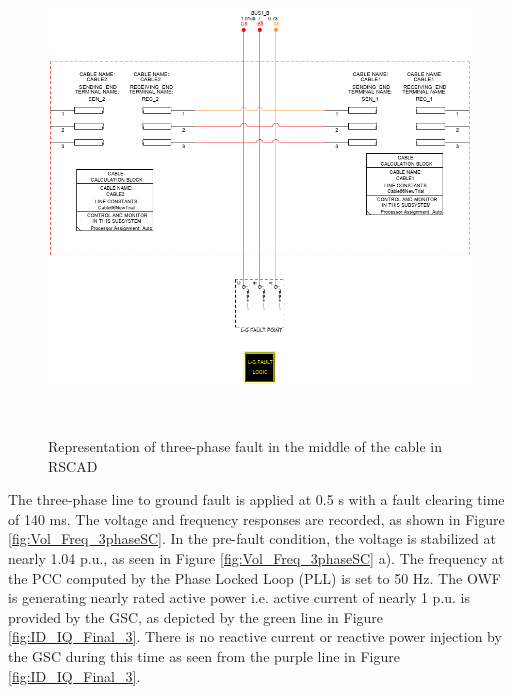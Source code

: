 \begin{figure}[H]
\centering
    \includegraphics[height = 12.5cm,width = 13.5cm]{Diagrams/Chapter_3/2CablesBlockWithFault.png}
    \caption{Representation of three-phase fault in the middle of the cable in RSCAD}
    \label{fig:2cablesblockwithfault}
\end{figure}

The three-phase line to ground fault is applied at 0.5 s with a fault clearing time of 140 ms. The voltage and frequency responses are recorded, as shown in Figure \ref{fig:Vol_Freq_3phaseSC}. In the pre-fault condition, the voltage is stabilized at nearly 1.04 p.u., as seen in Figure \ref{fig:Vol_Freq_3phaseSC} a). 
The frequency at the \gls{PCC} computed by the Phase Locked Loop (\gls{PLL}) is set to 50 Hz.
The \gls{OWF} is generating nearly rated active power i.e. active current of nearly 1 p.u. is provided by the \gls{GSC}, as depicted by the green line in Figure \ref{fig:ID_IQ_Final_3}. There is no reactive current or reactive power injection by the \gls{GSC} during this time as seen from the purple line in Figure \ref{fig:ID_IQ_Final_3}. 

